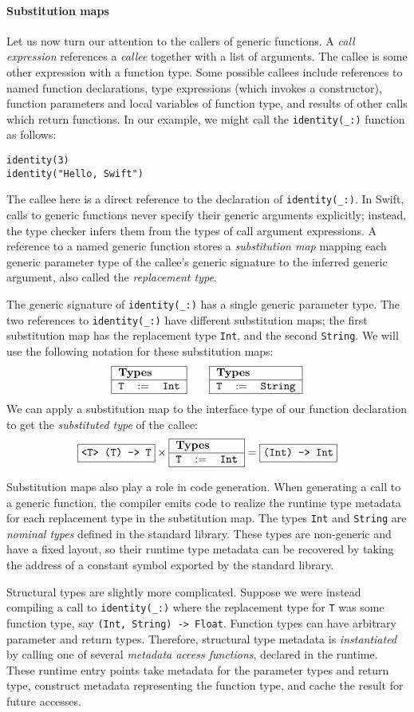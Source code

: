 \documentclass[a4paper,headsepline,bibliography=totoc,toc=flat,fleqn,twoside=semi]{scrbook}
\theoremstyle{definition}
\theoremstyle{definition}
\theoremstyle{definition}
\newcommand{\ttbox}[1]{\boxed{\mbox{\vphantom{pI\texttt{pI}}\texttt{#1}}}}
\newcommand{\SubMap}[1]{\begin{tabular}{|lll|}
\hline
\multicolumn{3}{|l|}{\textbf{Types}}\\
\hline
#1\\
\hline
\end{tabular}}
\newcommand{\SubType}[2]{\texttt{#1}&$:=$&\texttt{#2}}
\begin{document}
\paragraph{Substitution maps} Let us now turn our attention to the callers of generic functions. A \emph{call expression} references a \emph{callee} together with a list of arguments. The callee is some other expression with a function type. Some possible callees include references to named function declarations, type expressions (which invokes a constructor), function parameters and local variables of function type, and results of other calls which return functions. In our example, we might call the \verb|identity(_:)| function as follows:
\begin{Verbatim}
identity(3)
identity("Hello, Swift")
\end{Verbatim}
The callee here is a direct reference to the declaration of \verb|identity(_:)|. In Swift, calls to generic functions never specify their generic arguments explicitly; instead, the type checker infers them from the types of call argument expressions. A reference to a named generic function stores a \emph{substitution map} mapping each generic parameter type of the callee's generic signature to the inferred generic argument, also called the \emph{replacement type}.

The generic signature of \verb|identity(_:)| has a single generic parameter type. The two references to \verb|identity(_:)| have different substitution maps; the first substitution map has the replacement type \texttt{Int}, and the second \texttt{String}. We will use the following notation for these substitution maps:
\[
\SubMap{\SubType{T}{Int}}
\qquad
\SubMap{\SubType{T}{String}}
\]
We can apply a substitution map to the interface type of our function declaration to get the \emph{substituted type} of the callee:
\[\ttbox{<T> (T) -> T} \times \SubMap{\SubType{T}{Int}} = \ttbox{(Int) -> Int}\]

Substitution maps also play a role in code generation. When generating a call to a generic function, the compiler emits code to realize the runtime type metadata for each replacement type in the substitution map. The types \texttt{Int} and \texttt{String} are \emph{nominal types} defined in the standard library. These types are non-generic and have a fixed layout, so their runtime type metadata can be recovered by taking the address of a constant symbol exported by the standard library.

Structural types are slightly more complicated. Suppose we were instead compiling a call to \verb|identity(_:)| where the replacement type for \texttt{T} was some function type, say \verb|(Int, String) -> Float|. Function types can have arbitrary parameter and return types. Therefore, structural type metadata is \emph{instantiated} by calling one of several \emph{metadata access functions}, declared in the runtime. These runtime entry points take metadata for the parameter types and return type, construct metadata representing the function type, and cache the result for future accesses.
\end{document}
